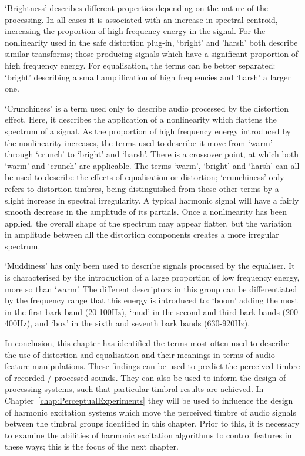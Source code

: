 	`Brightness' describes different properties depending on the nature of the processing. In all cases it is
	associated with an increase in spectral centroid, increasing the proportion of high frequency energy in the signal.
	For the nonlinearity used in the \acrshort{safe} distortion plug-in, `bright' and 'harsh' both describe similar
	transforms; those producing signals which have a significant proportion of high frequency energy. For equalisation,
	the terms can be better separated: `bright' describing a small amplification of high frequencies and `harsh' a
	larger one.

	`Crunchiness' is a term used only to describe audio processed by the distortion effect. Here, it describes the
	application of a nonlinearity which flattens the spectrum of a signal. As the proportion of high frequency energy
	introduced by the nonlinearity increases, the terms used to describe it move from `warm' through `crunch' to
	`bright' and `harsh'. There is a crossover point, at which both `warm' and `crunch' are applicable. The terms
	`warm', `bright' and `harsh' can all be used to describe the effects of equalisation or distortion; `crunchiness'
	only refers to distortion timbres, being distinguished from these other terms by a slight increase in spectral
	irregularity. A typical harmonic signal will have a fairly smooth decrease in the amplitude of its partials. Once a
	nonlinearity has been applied, the overall shape of the spectrum may appear flatter, but the variation in amplitude
	between all the distortion components creates a more irregular spectrum.

	`Muddiness' has only been used to describe signals processed by the equaliser. It is characterised by the
	introduction of a large proportion of low frequency energy, more so than `warm'. The different descriptors in this
	group can be differentiated by the frequency range that this energy is introduced to: `boom' adding the most in the
	first bark band (20-100Hz), `mud' in the second and third bark bands (200-400Hz), and `box' in the sixth and
	seventh bark bands (630-920Hz).

	In conclusion, this chapter has identified the terms most often used to describe the use of distortion and
	equalisation and their meanings in terms of audio feature manipulations. These findings can be used to predict the
	perceived timbre of recorded / processed sounds. They can also be used to inform the design of processing systems,
	such that particular timbral results are achieved. In Chapter~\ref{chap:PerceptualExperiments} they will be used to
	influence the design of harmonic excitation systems which move the perceived timbre of audio signals between the
	timbral groups identified in this chapter. Prior to this, it is necessary to examine the abilities of harmonic
	excitation algorithms to control features in these ways; this is the focus of the next chapter.
